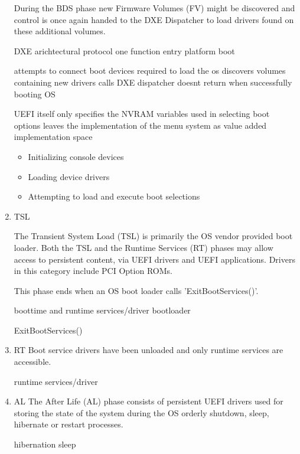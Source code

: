 \begin{enumerate}

    During the BDS phase new Firmware Volumes (FV) might be discovered and control is once again handed to the DXE Dispatcher to load drivers found on these additional volumes.


    DXE arichtectural protocol
    one function entry
    platform boot

    attempts to connect boot devices required to load the os
    discovers volumes containing new drivers
    calls DXE dispatcher
    doesnt return when successfully booting OS

    UEFI itself only specifies the NVRAM variables used in selecting boot options
    leaves the implementation of the menu system as value added implementation space \cite{uefi-spec}

    \cite{pi-spec}

    \begin{itemize}
        \item Initializing console devices
        \item Loading device drivers
        \item Attempting to load and execute boot selections
    \end{itemize}

    \item{\acf{TSL}}

    The Transient System Load (TSL) is primarily the OS vendor provided boot loader. Both the TSL and the Runtime Services (RT) phases may allow access to persistent content, via UEFI drivers and UEFI applications. Drivers in this category include PCI Option ROMs.

    This phase ends when an OS boot loader calls 'ExitBootServices()'.

    boottime and runtime services/driver
    bootloader
    \cite[13.3 System Partition]{uefi-spec}
    \cite[3.5.1.1]{uefi-spec}

    ExitBootServices()

    \item{\acf{RT}}
    Boot service drivers have been unloaded and only runtime services are accessible.


    runtime services/driver

    \item{\acf{AL}}
    The After Life (AL) phase consists of persistent UEFI drivers used for storing the state of the system during the OS orderly shutdown, sleep, hibernate or restart processes.

    hibernation
    sleep

\end{enumerate}

